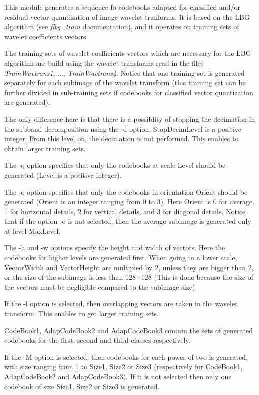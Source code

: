 This module generates a sequence fo codebooks adapted 
for classified and/or residual vector quantization of image wavelet tranforms. 
It is based on the LBG algorithm (see {\em flbg\_train} documentation), 
and it operates on training sets of wavelet coefficients vectors. 

The training sets of wavelet coefficients vectors which are necessary 
for the LBG algorithm are build using the wavelet transforms 
read in the files {\em TrainWavtrans1}, ..., {\em TrainWavtrans4}. 
Notice that one training set is generated separately for each subimage 
of the wavelet transform (this training set can be further divided 
in sub-training sets if codebooks for classified vector quantization 
are generated). 

The only difference here is that there is a possiblity 
of stopping the decimation in the subband decomposition using the -d 
option. StopDecimLevel is a positive integer. From this level on, 
the decimation is not performed. This enables to obtain larger 
training sets. 

The -q option specifies that only the codebooks at scale Level 
should be generated (Level is a positive integer). 

The -o option specifies that only the codebooks in orientation 
Orient should be generated (Orient is an integer ranging from 0 to 3). 
Here Orient is 0 for average, 1 for horizontal details, 2 for vertical 
details, and 3 for diagonal details. Notice that if the option -o 
is not selected, then the average subimage is generated only at level 
MaxLevel. 

The -h and -w options specify the height and width of vectors. 
Here the codebooks for higher levels are generated first. 
When going to a lower scale, VectorWidth and VectorHeight are multipied 
by 2, unless they are bigger than 2, or the size of the subimage 
is less than 128$\times$128 (This is done because the size of the 
vectors must be negligible compared to the subimage size). 

If the -l option is selected, then overlapping vectors are taken in the 
wavelet transform. This enables to get larger training sets. 

CodeBook1, AdapCodeBook2 and AdapCodeBook3 contain the sets of generated 
codebooks for the first, second and third classes respectively. 

If the -M option is selected, then codebooks for each power of two is 
generated, with size ranging from 1 to Size1, Size2 or Size3 
(respectively for CodeBook1, AdapCodeBook2 and AdapCodeBook3). 
If it is not selected then only one codebook of size Size1, Size2 or Size3 
is generated. 

